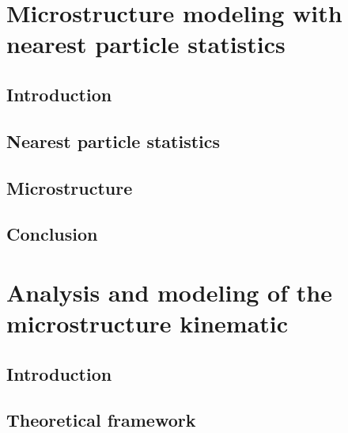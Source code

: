 \documentclass[12pt,a4paper,openany]{My_book}
\begin{document}

\chapter{Microstructure modeling with nearest particle statistics}
\localtableofcontents

\section{Introduction}


\section{Nearest particle statistics}
\label{sec:nearest}


\section{Microstructure}
\label{sec:microstructure}



\section{Conclusion}
\label{sec:conclusion}



\chapter{Analysis and modeling of the microstructure kinematic}
\localtableofcontents

\section{Introduction}



\section{Theoretical framework}
\label{sec:Theory}


\end{document}
